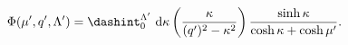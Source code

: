 \begin{equation}
\Phi(\mu',q',\Lambda')=
  \dashint_0^{\Lambda'}  \ 
{\rm d}\kappa
\left( \frac{\kappa}{(q')^2 - \kappa^2 } \right)
\frac{\sinh \kappa}{\cosh \kappa + \cosh \mu'}  .
\label{t18}
\end{equation}

